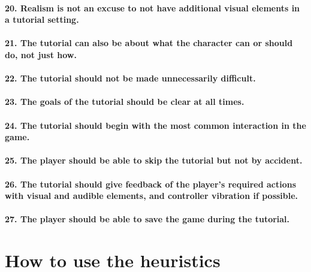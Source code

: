 \paragraph{20. Realism is not an excuse to not have additional visual elements in a tutorial setting.}
\paragraph{21. The tutorial can also be about what the character can or should do, not just how.}
\paragraph{22. The tutorial should not be made unnecessarily difficult.}
\paragraph{23. The goals of the tutorial should be clear at all times.}
\paragraph{24. The tutorial should begin with the most common interaction in the game.}
\paragraph{25. The player should be able to skip the tutorial but not by accident.}
\paragraph{26. The tutorial should give feedback of the player's required actions with visual and audible elements, and controller vibration if possible.}
\paragraph{27. The player should be able to save the game during the tutorial.}

\section{How to use the heuristics}

